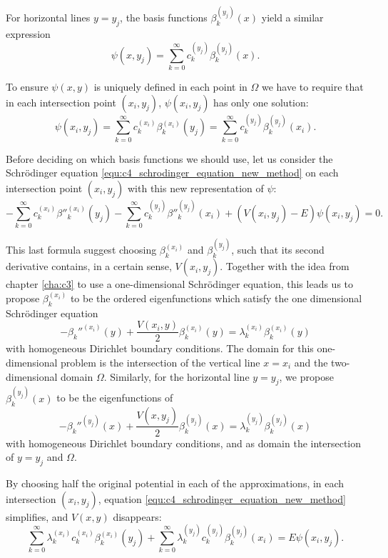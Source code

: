 For horizontal lines $y = y_j$, the basis functions $\beta_k^{(y_j)}(x)$ yield a similar expression
\begin{equation}\label{equ:c4_expression_on_lines_y}
    \psi(x, y_j) = \sum_{k=0}^\infty c_k^{(y_j)} \beta_k^{(y_j)}(x) \text{.}
\end{equation}

To ensure $\psi(x, y)$ is uniquely defined in each point in $\Omega$ we have to require that in each intersection point $(x_i, y_j)$, $\psi(x_i, y_j)$ has only one solution:
\begin{equation}\label{equ:c4_new_method_pre_matrix_equality}
    \psi(x_i, y_j) = \sum_{k=0}^\infty c_k^{(x_i)} \beta_k^{(x_i)}(y_j) = \sum_{k=0}^\infty c_k^{(y_j)} \beta_k^{(y_j)}(x_i)\text{.}
\end{equation}

Before deciding on which basis functions we should use, let us consider the Schrödinger equation \eqref{equ:c4_schrodinger_equation_new_method} on each intersection point $(x_i, y_j)$ with this new representation of $\psi$:
$$
    -\sum_{k=0}^\infty c_k^{(x_i)} \beta''^{(x_i)}_k(y_j) - \sum_{k=0}^\infty c_k^{(y_j)} \beta''^{(y_j)}_k(x_i) + (V(x_i, y_j) - E) \psi(x_i, y_j) = 0\text{.}
$$

This last formula suggest choosing $\beta_k^{(x_i)}$ and $\beta_k^{(y_j)}$, such that its second derivative contains, in a certain sense, $V(x_i, y_j)$. Together with the idea from chapter \ref{cha:c3} to use a one-dimensional Schrödinger equation, this leads us to propose $\beta_k^{(x_i)}$ to be the ordered eigenfunctions which satisfy the one dimensional Schrödinger equation
$$
    -\beta_k''^{(x_i)}(y) + \frac{V(x_i, y)}{2}\beta_k^{(x_i)}(y) = \lambda_k^{(x_i)} \beta_k^{(x_i)}(y)
$$
with homogeneous Dirichlet boundary conditions. The domain for this one-dimensional problem is the intersection of the vertical line $x = x_i$ and the two-dimensional domain $\Omega$. Similarly, for the horizontal line $y = y_j$, we propose $\beta_k^{(y_j)}(x)$ to be the eigenfunctions of
$$
    -\beta_k''^{(y_j)}(x) + \frac{V(x, y_j)}{2}\beta_k^{(y_j)}(x) = \lambda_k^{(y_j)} \beta_k^{(y_j)}(x)
$$
with homogeneous Dirichlet boundary conditions, and as domain the intersection of $y = y_j$ and $\Omega$.

By choosing half the original potential in each of the approximations, in each intersection $(x_i, y_j)$, equation \eqref{equ:c4_schrodinger_equation_new_method} simplifies, and $V(x, y)$ disappears:
\begin{equation}\label{equ:c4_new_method_pre_matrix}
    \sum_{k=0}^\infty \lambda_k^{(x_i)} c_k^{(x_i)} \beta^{(x_i)}_k(y_j) + \sum_{k=0}^\infty \lambda_k^{(y_j)} c_k^{(y_j)} \beta_k^{(y_j)}(x_i) = E \psi(x_i, y_j) \text{.}
\end{equation}

